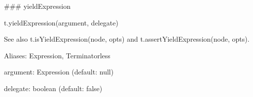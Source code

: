 \#\#\# yield\+Expression 
\begin{DoxyCode}
t.yieldExpression(argument, delegate)
\end{DoxyCode}


See also {\ttfamily t.\+is\+Yield\+Expression(node, opts)} and {\ttfamily t.\+assert\+Yield\+Expression(node, opts)}.

Aliases\+: {\ttfamily Expression}, {\ttfamily Terminatorless}


\begin{DoxyItemize}
\item {\ttfamily argument}\+: {\ttfamily Expression} (default\+: {\ttfamily null})
\item {\ttfamily delegate}\+: {\ttfamily boolean} (default\+: {\ttfamily false}) 

 
\end{DoxyItemize}